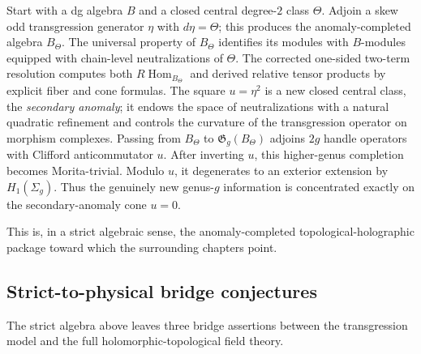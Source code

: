 Start with a dg algebra \(B\) and a closed central degree-\(2\) class \(\Theta\).
Adjoin a skew odd transgression generator \(\eta\) with \(d\eta=\Theta\); this produces the anomaly-completed algebra \(B_{\Theta}\).
The universal property of \(B_{\Theta}\) identifies its modules with \(B\)-modules equipped with chain-level neutralizations of \(\Theta\).
The corrected one-sided two-term resolution computes both
\(R\!\operatorname{Hom}_{B_{\Theta}}\) and derived relative tensor products by explicit fiber and cone formulas.
The square \(u=\eta^{2}\) is a new closed central class, the \emph{secondary anomaly}; it endows the space of neutralizations with a natural quadratic refinement and controls the curvature of the transgression operator on morphism complexes.
Passing from \(B_{\Theta}\) to \(\mathfrak{G}_{g}(B_{\Theta})\) adjoins \(2g\) handle operators with Clifford anticommutator \(u\).
After inverting \(u\), this higher-genus completion becomes Morita-trivial.
Modulo \(u\), it degenerates to an exterior extension by \(H_{1}(\Sigma_{g})\).
Thus the genuinely new genus-\(g\) information is concentrated exactly on the secondary-anomaly cone \(u=0\).

This is, in a strict algebraic sense, the anomaly-completed topological-holographic package toward which the surrounding chapters point.

\subsection{Strict-to-physical bridge conjectures}

The strict algebra above leaves three bridge assertions between the
transgression model and the full holomorphic-topological field theory.

